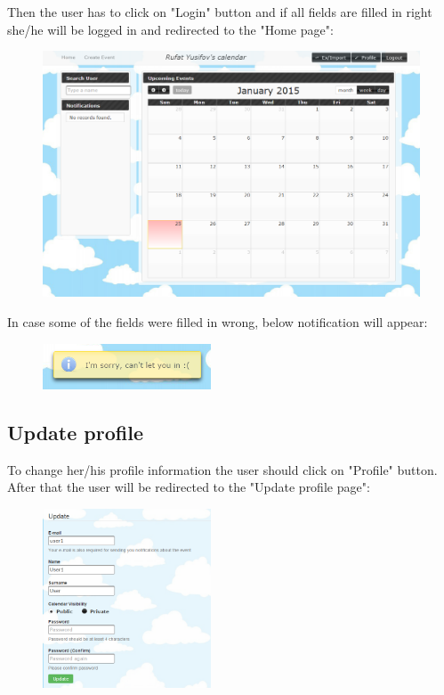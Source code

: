 \par Then the user has to click on "Login" button and if all fields are filled in right she/he will be logged in and redirected to the "Home page":
\begin{figure}[tbh]
  \begin{center}
    \includegraphics[width=120mm]{homep}
  \end{center}
\end{figure}

\par In case some of the fields were filled in wrong, below notification will appear:
\begin{figure}[tbh]
  \begin{center}
    \includegraphics[width=50mm]{erlog}
  \end{center}
\end{figure}

\newpage
\subsection{Update profile}
\par \qquad To change her/his profile information the user should click on "Profile" button. After that the user will be redirected to the "Update profile page":
\begin{figure}[tbh]
  \begin{center}
    \includegraphics[width=50mm]{updatepr}
  \end{center}
\end{figure}


